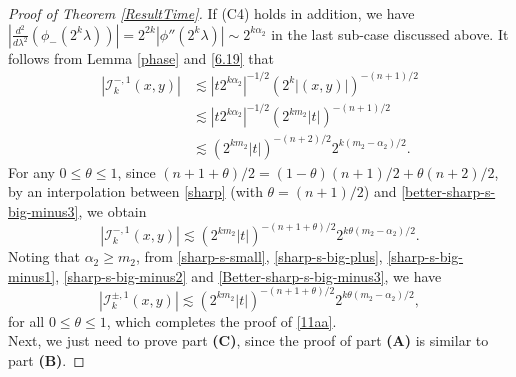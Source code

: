 \documentclass[a4paper,11pt, reqno]{amsart}
\numberwithin{equation}{section}
\theoremstyle{plain}
\theoremstyle{definition}
\theoremstyle{remark}
\begin{document}
\begin{proof}[Proof of Theorem \ref{ResultTime}]
  
If (C4) holds in addition, we have $\left|\frac{d^2}{d\lambda^2}\left(\phi_-(2^k\lambda)\right)\right|=2^{2k}|\phi''(2^k\lambda)|\sim 2^{k\alpha_2}$ in the last sub-case discussed above. It follows from Lemma \ref{phase} and \eqref{6.19} that
\begin{equation}\label{better-sharp-s-big-minus3}
\begin{aligned}
|\mathcal{I}_k^{-,1}(x,y)|&\lesssim |t2^{k\alpha_2}|^{-1/2}\left(2^k|(x,y)|\right)^{-(n+1)/2}\\
&\lesssim |t2^{k\alpha_2}|^{-1/2}\left(2^{km_2}|t|\right)^{-(n+1)/2}\\
&\lesssim \left(2^{km_2}|t|\right)^{-(n+2)/2}2^{k(m_2-\alpha_2)/2}.
\end{aligned}
 \end{equation}
For any $0\leq \theta\leq 1$,   since $(n+1+\theta)/2=(1-\theta)(n+1)/2+\theta (n+2)/2$, by an interpolation between \eqref{sharp} (with $\theta=(n+1)/2$) and \eqref{better-sharp-s-big-minus3}, we obtain
\begin{equation}\label{Better-sharp-s-big-minus3}
|\mathcal{I}_k^{-,1}(x,y)|\lesssim \left(2^{km_2}|t|\right)^{-(n+1+\theta)/2}2^{k\theta(m_2-\alpha_2)/2}.
 \end{equation}
Noting that $\alpha_2\geq m_2$, from \eqref{sharp-s-small}, \eqref{sharp-s-big-plus}, \eqref{sharp-s-big-minus1}, \eqref{sharp-s-big-minus2} and \eqref{Better-sharp-s-big-minus3}, we have
\begin{equation}\label{better-sharp}
|\mathcal{I}_k^{\pm,1}(x,y)|\lesssim \left(2^{km_2}|t|\right)^{-(n+1+\theta)/2}2^{k\theta(m_2-\alpha_2)/2},
 \end{equation}
 for all $0\leq\theta\leq 1$, which completes the proof of \eqref{11aa}.\\

  

Next, we just need to prove part \textbf{(C)}, since the proof of part \textbf{(A)} is similar to part \textbf{(B)}.


\end{proof}
\end{document}

